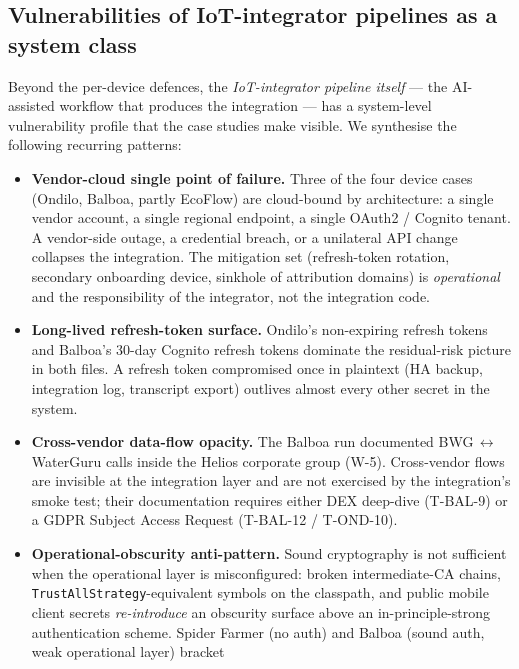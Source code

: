 \documentclass[11pt,a4paper]{article}
\newcommand{\fp}[1]{\path{#1}}
\begin{document}
\subsection{Vulnerabilities of IoT-integrator pipelines as a system class}
\label{sec:synthesis-pipeline-vuln}
Beyond the per-device defences, the \emph{IoT-integrator pipeline
itself} --- the AI-assisted workflow that produces the integration ---
has a system-level vulnerability profile that the case studies make
visible. We synthesise the following recurring patterns:
\begin{itemize}
  \item \textbf{Vendor-cloud single point of failure.} Three of the
        four device cases (Ondilo, Balboa, partly EcoFlow) are
        cloud-bound by architecture: a single vendor account, a single
        regional endpoint, a single OAuth2 / Cognito tenant. A
        vendor-side outage, a credential breach, or a unilateral API
        change collapses the integration. The mitigation set
        (refresh-token rotation, secondary onboarding device, sinkhole
        of attribution domains) is \emph{operational} and the
        responsibility of the integrator, not the integration code.
  \item \textbf{Long-lived refresh-token surface.} Ondilo's
        non-expiring refresh tokens and Balboa's 30-day Cognito refresh
        tokens dominate the residual-risk picture in both
        \fp{RESEARCH-PROTOCOL.md} files. A refresh token compromised
        once in plaintext (HA backup, integration log, transcript
        export) outlives almost every other secret in the system.
  \item \textbf{Cross-vendor data-flow opacity.} The Balboa run
        documented BWG\,$\leftrightarrow$\,WaterGuru calls inside the
        Helios corporate group (W-5). Cross-vendor flows are invisible
        at the integration layer and are not exercised by the
        integration's smoke test; their documentation requires either
        DEX deep-dive (T-BAL-9) or a GDPR Subject Access Request
        (T-BAL-12 / T-OND-10).
  \item \textbf{Operational-obscurity anti-pattern.} Sound cryptography
        is not sufficient when the operational layer is misconfigured:
        broken intermediate-CA chains, \texttt{TrustAllStrategy}-equivalent
        symbols on the classpath, and public mobile client secrets
        \emph{re-introduce} an obscurity surface above an
        in-principle-strong authentication scheme. Spider Farmer (no
        auth) and Balboa (sound auth, weak operational layer) bracket

\end{itemize}
\end{document}
